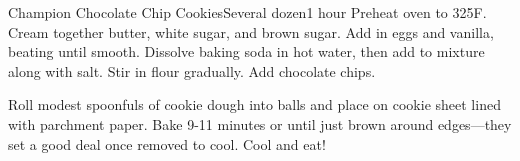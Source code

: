 \begin{recipe}{Champion Chocolate Chip Cookies}{Several dozen}{1 hour}
  Preheat oven to 325\0F.
  Cream together butter, white sugar, and brown sugar. Add in eggs and vanilla,
  beating until smooth.
  Dissolve baking soda in hot water, then add to mixture along with salt.
  Stir in flour gradually. Add chocolate chips.

  Roll modest spoonfuls of cookie dough into balls and place on cookie sheet
  lined with parchment paper. Bake 9-11 minutes or until just brown around
  edges---they set a good deal once removed to cool. Cool and eat!
\end{recipe}


